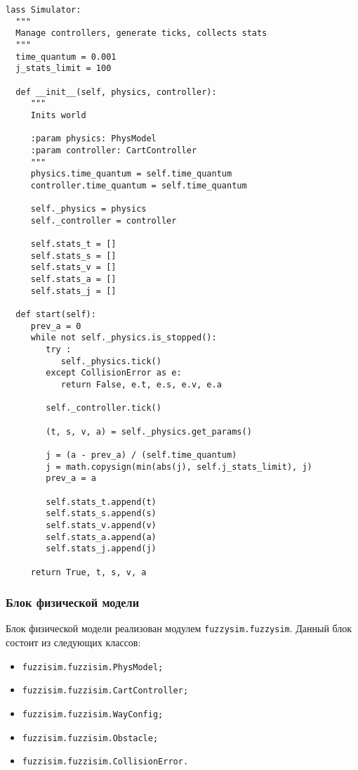 \begin{lstlisting}[style=pythonstyle,caption={  }, label=lst:func:1]
lass Simulator:
  """
  Manage controllers, generate ticks, collects stats
  """
  time_quantum = 0.001
  j_stats_limit = 100

  def __init__(self, physics, controller):
     """
     Inits world

     :param physics: PhysModel
     :param controller: CartController
     """
     physics.time_quantum = self.time_quantum
     controller.time_quantum = self.time_quantum

     self._physics = physics
     self._controller = controller

     self.stats_t = []
     self.stats_s = []
     self.stats_v = []
     self.stats_a = []
     self.stats_j = []

  def start(self):
     prev_a = 0
     while not self._physics.is_stopped():
        try :
           self._physics.tick()
        except CollisionError as e:
           return False, e.t, e.s, e.v, e.a

        self._controller.tick()

        (t, s, v, a) = self._physics.get_params()

        j = (a - prev_a) / (self.time_quantum)
        j = math.copysign(min(abs(j), self.j_stats_limit), j)
        prev_a = a

        self.stats_t.append(t)
        self.stats_s.append(s)
        self.stats_v.append(v)
        self.stats_a.append(a)
        self.stats_j.append(j)

     return True, t, s, v, a
\end{lstlisting}

\subsubsection{ Блок физической модели}

Блок физической модели реализован модулем \lstinline!fuzzysim.fuzzysim!. Данный блок состоит из следующих классов:

\begin{itemize}
	\item \lstinline!fuzzisim.fuzzisim.PhysModel;!
	\item \lstinline!fuzzisim.fuzzisim.CartController;!
	\item \lstinline!fuzzisim.fuzzisim.WayConfig;!
	\item \lstinline!fuzzisim.fuzzisim.Obstacle;!
	\item \lstinline!fuzzisim.fuzzisim.CollisionError.!
\end{itemize}

